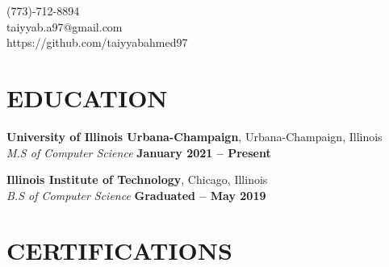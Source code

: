 \documentclass[margin,line]{resume}
\begin{document}
{
    \hfill (773)-712-8894       \vspace{0mm}\\\vspace{0mm}%
    \hfill taiyyab.a97@gmail.com           \vspace{0mm}\\\vspace{0mm}%
    \hfill https://github.com/taiyyabahmed97 \vspace{0mm}\\\vspace{-9mm}%
}

\begin{resume}

    \vspace{-3mm}


    \vspace{-1mm}



    \section{\mysidestyle \textbf{\large{E}\small{DUCATION}}}

    \textbf{\listing University of Illinois Urbana-Champaign}, Urbana-Champaign, Illinois \vspace{1mm}\\
    \textsl{M.S of Computer Science} \hfill \textbf{January 2021 -- Present}\vspace{-3mm}\\\vspace{-1mm}%

    \textbf{\listing Illinois Institute of Technology}, Chicago, Illinois \vspace{1mm}\\
    \textsl{B.S of Computer Science}  \hfill \textbf{Graduated -- May 2019}\vspace{-3mm}\\\vspace{-1mm}%

    \vspace{-1mm}

    \section{\mysidestyle \textbf{\large{C}\small{ERTIFICATIONS}}}


\end{resume}
\end{document}
